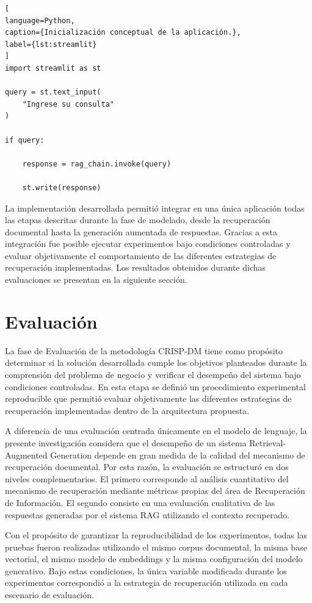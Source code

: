 \begin{lstlisting}[
language=Python,
caption={Inicialización conceptual de la aplicación.},
label={lst:streamlit}
]
import streamlit as st

query = st.text_input(
    "Ingrese su consulta"
)

if query:

    response = rag_chain.invoke(query)

    st.write(response)
\end{lstlisting}

La implementación desarrollada permitió integrar en una única aplicación todas las etapas descritas durante la fase de modelado, desde la recuperación documental hasta la generación aumentada de respuestas. Gracias a esta integración fue posible ejecutar experimentos bajo condiciones controladas y evaluar objetivamente el comportamiento de las diferentes estrategias de recuperación implementadas. Los resultados obtenidos durante dichas evaluaciones se presentan en la siguiente sección.

\section{Evaluación}

La fase de Evaluación de la metodología CRISP-DM tiene como propósito determinar si la solución desarrollada cumple los objetivos planteados durante la comprensión del problema de negocio y verificar el desempeño del sistema bajo condiciones controladas. En esta etapa se definió un procedimiento experimental reproducible que permitió evaluar objetivamente las diferentes estrategias de recuperación implementadas dentro de la arquitectura propuesta.

A diferencia de una evaluación centrada únicamente en el modelo de lenguaje, la presente investigación considera que el desempeño de un sistema Retrieval-Augmented Generation depende en gran medida de la calidad del mecanismo de recuperación documental. Por esta razón, la evaluación se estructuró en dos niveles complementarios. El primero corresponde al análisis cuantitativo del mecanismo de recuperación mediante métricas propias del área de Recuperación de Información. El segundo consiste en una evaluación cualitativa de las respuestas generadas por el sistema RAG utilizando el contexto recuperado.

Con el propósito de garantizar la reproducibilidad de los experimentos, todas las pruebas fueron realizadas utilizando el mismo corpus documental, la misma base vectorial, el mismo modelo de embeddings y la misma configuración del modelo generativo. Bajo estas condiciones, la única variable modificada durante los experimentos correspondió a la estrategia de recuperación utilizada en cada escenario de evaluación.

